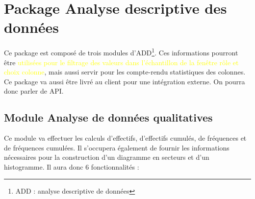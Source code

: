 	\section{Package Analyse descriptive des données}
	Ce package est composé de trois modules d'ADD\footnote{ADD : analyse descriptive de données}. Ces informations pourront être \textcolor{yellow}{utilisées pour le filtrage des valeurs dans l'échantillon de la fenêtre rôle et choix colonne}, mais aussi servir pour les compte-rendu statistiques des colonnes.
	Ce package va aussi être livré au client pour une intégration externe. On pourra donc parler de API.
	
		\subsection{Module Analyse de données qualitatives}
			Ce module va effectuer les calculs d'effectifs, d'effectifs cumulés, de fréquences et de fréquences cumulées. Il s'occupera également de fournir les informations nécessaires pour la construction d'un diagramme en secteurs et d'un histogramme. Il aura donc 6 fonctionnalités :
	
